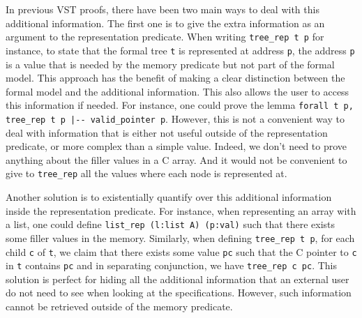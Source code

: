 In previous VST proofs, there have been two main ways to deal with this additional information.
The first one is to give the extra information as an argument to the representation predicate.
When writing \lstinline[language=Coq]{tree_rep t p} for instance, to state that the formal tree \texttt{t} is represented at address \texttt{p}, the address \texttt{p} is a value that is needed by the memory predicate but not part of the formal model.
This approach has the benefit of making a clear distinction between the formal model and the additional information.
This also allows the user to access this information if needed.
For instance, one could prove the lemma \lstinline[language=Coq]{forall t p, tree_rep t p |-- valid_pointer p}.
However, this is not a convenient way to deal with information that is either not useful outside of the representation predicate, or more complex than a simple value.
Indeed, we don't need to prove anything about the filler values in a C array. %
And it would not be convenient to give to \lstinline{tree_rep} all the values where each node is represented at.

Another solution is to existentially quantify over this additional information inside the representation predicate.
For instance, when representing an array with a list, one could define \lstinline{list_rep (l:list A) (p:val)} such that there exists some filler values in the memory.
Similarly, when defining \lstinline{tree_rep t p}, for each child \texttt{c} of \texttt{t}, we claim that there exists some value \texttt{pc} such that the C pointer to \texttt{c} in \texttt{t} contains \texttt{pc} and in separating conjunction, we have \lstinline{tree_rep c pc}.
This solution is perfect for hiding all the additional information that an external user do not need to see when looking at the specifications.
However, such information cannot be retrieved outside of the memory predicate.

